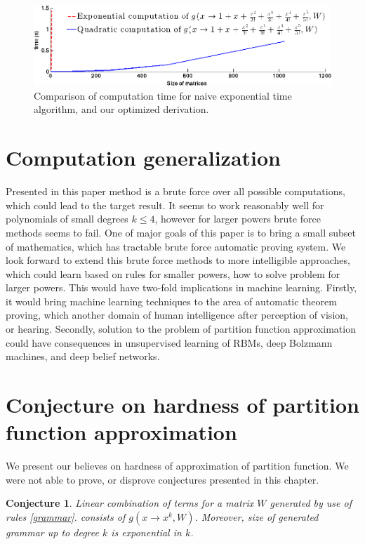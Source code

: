 \documentclass{article}
\newtheorem{conjecture}[theorem]{Conjecture}
\begin{document}
\begin{figure}[h]
\centering
\includegraphics[scale=0.24]{img/time_approx.png}
\caption{Comparison of computation time for naive exponential time algorithm, and our optimized derivation.}
\label{approximations}
\end{figure}

\section{Computation generalization}\label{agenda}

Presented in this paper method is a brute force over all possible computations, 
which could lead to the target result. It seems to work reasonably well
for polynomials of small degrees $k \leq 4$, however for larger powers 
brute force methods seems to fail. One of major goals of this paper is to
bring a small subset of mathematics, which has tractable brute force automatic proving
system. We look forward to extend this brute force methods to more intelligible approaches, which
could learn based on rules for smaller powers, how to solve problem for larger powers. This would
have two-fold implications in machine learning. Firstly, it would bring machine learning techniques
to the area of automatic theorem proving, which another domain of human intelligence after perception
of vision, or hearing. Secondly, solution to the problem of partition function approximation
could have consequences in unsupervised learning of RBMs, deep Bolzmann machines, and deep
belief networks. 

\section{Conjecture on hardness of partition function approximation}

We present our believes on hardness of approximation of partition function. 
We were not able to prove, or disprove conjectures presented in this chapter.
\begin{conjecture}
Linear combination of terms for a matrix $W$ generated by use of rules \ref{grammar}.
consists of $g(x \rightarrow x^k, W)$. Moreover, size of generated grammar
up to degree $k$ is exponential in $k$.
\label{simple}
\end{conjecture}
\end{document}

